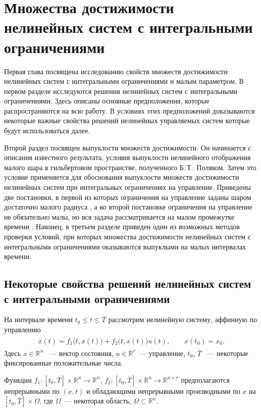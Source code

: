 \documentclass[../main.tex]{subfiles}
\begin{document}
\clearpage
\section{Множества достижимости нелинейных систем с интегральными ограничениями}
\label{s1}
Первая глава посвящена исследованию свойств множеств достижимости нелинейных систем с интегральными ограничениями и малым параметром.
В первом разделе исследуются решения нелинейных систем с интегральными ограничениями.
Здесь описаны основные предположения, которые распространяются на всю работу.
В условиях этих предположений доказываются некоторые важные свойства решений нелинейных управляемых систем которые будут использоваться далее. 
 
Второй раздел посвящен выпуклости множеств достижимости.
Он начинается с описания известного результата, условия выпуклости нелинейного отображения малого шара в гильбертовом пространстве, полученного Б.\,Т.~Поляком\cite{Polyak2001, Polyak2001ru}.
Затем это условие применяется для обоснования выпуклости множеств достижимости нелинейных систем при интегральных ограничениях на управление.
Приведены две постановки, в первой из которых ограничения на управление заданы шаром достаточно малого радиуса \cite{Polyak2004}, а во второй постановке ограничения на управление не обязательно малы, но вся задача рассматривается на малом промежутке времени \cite{GusevMotor, GusevOsipovTrudy}.
Наконец, в третьем разделе приведен один из возможных методов проверки условий, при которых множества достижимости нелинейных систем с интегральными ограничениями оказываются выпуклыми на малых интервалах времени. 
 
 
\subsection{Некоторые свойства решений нелинейных систем с интегральными ограничениями}
На интервале времени $ t_0 \leqslant t \leqslant \overline{T} $ рассмотрим нелинейную систему, аффинную по управлению
\begin{gather}\label{s1:common_nonlinear}
\begin{gathered}
 \dot{x}(t)=f_1\big(t,x(t)\big)+f_2\big(t,x(t)\big)u(t), \qquad x(t_0) = x_0.
\end{gathered}
\end{gather}
Здесь $ x \in \mathbb{R}^n $ ~--- вектор состояния, $ u \in \mathbb{R}^r $~--- управление, $t_0$, $ \overline{T} $ ~--- некоторые фиксированные положительные числа.
 
Функции $ f_1: [t_0, \overline{T}] \times \mathbb{R}^n \rightarrow \mathbb{R}^{n} $, $ f_2: [t_0, \overline{T}] \times \mathbb{R}^n \rightarrow \mathbb{R}^{n \times r} $ предполагаются непрерывными по $(x,t)$ и обладающими непрерывными производными по $ x $ на $ [t_0, \overline{T}] \times \Omega $, где $\Omega$~--- некоторая область, $\Omega \subset \mathbb{R}^n$. 
\end{document}
